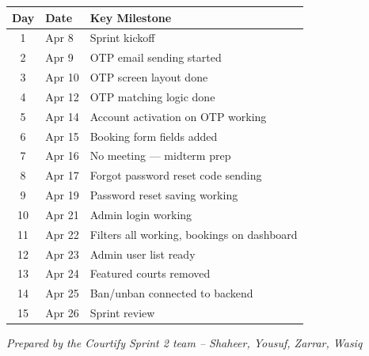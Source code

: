 \documentclass[12pt,a4paper]{article}
\begin{document}
\renewcommand{\arraystretch}{1.4}
\begin{tabularx}{\textwidth}{|c|l|X|}
\hline
\rowcolor{headerbg}\color{white}\bfseries Day & \color{white}\bfseries Date & \color{white}\bfseries Key Milestone \\ \hline
1  & Apr 8  & Sprint kickoff \\ \hline
\rowcolor{rowgray} 2  & Apr 9  & OTP email sending started \\ \hline
3  & Apr 10 & OTP screen layout done \\ \hline
\rowcolor{rowgray} 4  & Apr 12 & OTP matching logic done \\ \hline
5  & Apr 14 & Account activation on OTP working \\ \hline
\rowcolor{rowgray} 6  & Apr 15 & Booking form fields added \\ \hline
7  & Apr 16 & No meeting --- midterm prep \\ \hline
\rowcolor{rowgray} 8  & Apr 17 & Forgot password reset code sending \\ \hline
9  & Apr 19 & Password reset saving working \\ \hline
\rowcolor{rowgray} 10 & Apr 21 & Admin login working \\ \hline
11 & Apr 22 & Filters all working, bookings on dashboard \\ \hline
\rowcolor{rowgray} 12 & Apr 23 & Admin user list ready \\ \hline
13 & Apr 24 & Featured courts removed \\ \hline
\rowcolor{rowgray} 14 & Apr 25 & Ban/unban connected to backend \\ \hline
15 & Apr 26 & Sprint review \\ \hline
\end{tabularx}

\vspace{2cm}
\begin{center}
\textit{Prepared by the Courtify Sprint 2 team -- Shaheer, Yousuf, Zarrar, Wasiq}
\end{center}
\end{document}
